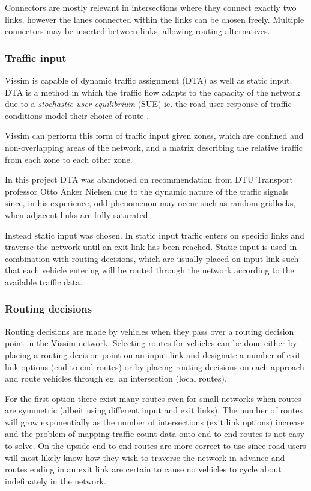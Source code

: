 Connectors are mostly relevant in intersections where they connect exactly two links, however the lanes connected within the links can be chosen freely. Multiple connectors may be inserted between links, allowing routing alternatives.

\subsubsection*{Traffic input}
Vissim is capable of dynamic traffic assignment (DTA) as well as static input. DTA is a method in which the traffic flow adapts to the capacity of the network due to a \textit{stochastic user equilibrium} (SUE) ie. the road user response of traffic conditions model their choice of route \cite{Wardrop}. 

Vissim can perform this form of traffic input given zones, which are confined and non-overlapping areas of the network, and a matrix describing the relative traffic from each zone to each other zone.

In this project DTA was abandoned on recommendation from DTU Transport professor Otto Anker Nielsen due to the dynamic nature of the traffic signals since, in his experience, odd phenomenon may occur such as random gridlocks, when adjacent links are fully saturated.

Instead static input was chosen. In static input traffic enters on specific links and traverse the network until an exit link has been reached. Static input is used in combination with routing decisions, which are usually placed on input link such that each vehicle entering will be routed through the network according to the available traffic data.

\subsubsection*{Routing decisions}
\label{routingdecisions}
Routing decisions are made by vehicles when they pass over a routing decision point in the Vissim network. Selecting routes for vehicles can be done either by placing a routing decision point on an input link and designate a number of exit link options (end-to-end routes) or by placing routing decisions on each approach and route vehicles through eg. an intersection (local routes).

For the first option there exist many routes even for small networks when routes are symmetric (albeit using different input and exit links). The number of routes will grow exponentially as the number of intersections (exit link options) increase and the problem of mapping traffic count data onto end-to-end routes is not easy to solve. On the upside end-to-end routes are more correct to use since road users will most likely know how they wish to traverse the network in advance and routes ending in an exit link are certain to cause no vehicles to cycle about indefinately in the network.

